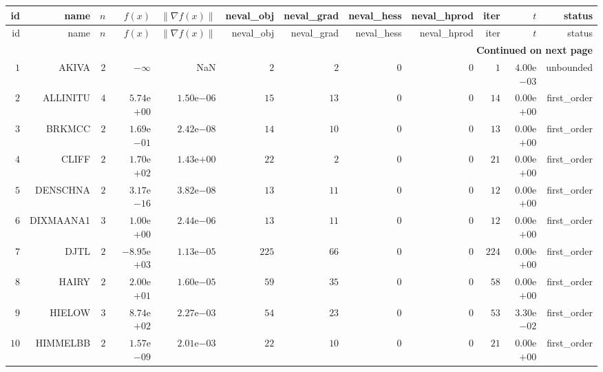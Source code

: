\begin{longtable}{rrrrrrrrrrrr}
  \hline
  id & name & \(n\) & \(f(x)\) & \(\|\nabla f(x)\|\) & neval\_obj & neval\_grad & neval\_hess & neval\_hprod & iter & \(t\) & status \\\hline
  \endfirsthead
  \hline
  id & name & \(n\) & \(f(x)\) & \(\|\nabla f(x)\|\) & neval\_obj & neval\_grad & neval\_hess & neval\_hprod & iter & \(t\) & status \\\hline
  \endhead
  \hline
  \multicolumn{12}{r}{{\bfseries Continued on next page}}\\
  \hline
  \endfoot
  \endlastfoot
  \(     1\) & AKIVA & \(     2\) & \(-\infty\) &       NaN & \(     2\) & \(     2\) & \(     0\) & \(     0\) & \(     1\) & \( 4.00\)e\(-03\) & unbounded \\
  \(     2\) & ALLINITU & \(     4\) & \( 5.74\)e\(+00\) & \( 1.50\)e\(-06\) & \(    15\) & \(    13\) & \(     0\) & \(     0\) & \(    14\) & \( 0.00\)e\(+00\) & first\_order \\
  \(     3\) & BRKMCC & \(     2\) & \( 1.69\)e\(-01\) & \( 2.42\)e\(-08\) & \(    14\) & \(    10\) & \(     0\) & \(     0\) & \(    13\) & \( 0.00\)e\(+00\) & first\_order \\
  \(     4\) & CLIFF & \(     2\) & \( 1.70\)e\(+02\) & \( 1.43\)e\(+00\) & \(    22\) & \(     2\) & \(     0\) & \(     0\) & \(    21\) & \( 0.00\)e\(+00\) & first\_order \\
  \(     5\) & DENSCHNA & \(     2\) & \( 3.17\)e\(-16\) & \( 3.82\)e\(-08\) & \(    13\) & \(    11\) & \(     0\) & \(     0\) & \(    12\) & \( 0.00\)e\(+00\) & first\_order \\
  \(     6\) & DIXMAANA1 & \(     3\) & \( 1.00\)e\(+00\) & \( 2.44\)e\(-06\) & \(    13\) & \(    11\) & \(     0\) & \(     0\) & \(    12\) & \( 0.00\)e\(+00\) & first\_order \\
  \(     7\) & DJTL & \(     2\) & \(-8.95\)e\(+03\) & \( 1.13\)e\(-05\) & \(   225\) & \(    66\) & \(     0\) & \(     0\) & \(   224\) & \( 0.00\)e\(+00\) & first\_order \\
  \(     8\) & HAIRY & \(     2\) & \( 2.00\)e\(+01\) & \( 1.60\)e\(-05\) & \(    59\) & \(    35\) & \(     0\) & \(     0\) & \(    58\) & \( 0.00\)e\(+00\) & first\_order \\
  \(     9\) & HIELOW & \(     3\) & \( 8.74\)e\(+02\) & \( 2.27\)e\(-03\) & \(    54\) & \(    23\) & \(     0\) & \(     0\) & \(    53\) & \( 3.30\)e\(-02\) & first\_order \\
  \(    10\) & HIMMELBB & \(     2\) & \( 1.57\)e\(-09\) & \( 2.01\)e\(-03\) & \(    22\) & \(    10\) & \(     0\) & \(     0\) & \(    21\) & \( 0.00\)e\(+00\) & first\_order \\

\end{longtable}
